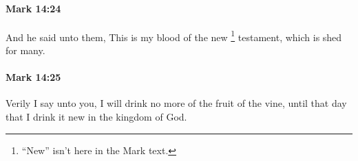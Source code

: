 		\paragraph{Mark 14:24} %
			\label{MARK-14-24}

			And he said unto them, This is my blood of the new%
				\footnote{%
					``New'' isn't here in the Mark text.
					}
			testament, which is shed for many.

			\begin{framed}
			\scriptsize
				\begin{compactdesc}
					\item[SBLG]  \hyperref[DIATHEKE]{} 
				\end{compactdesc}
			\end{framed}

		\paragraph{Mark 14:25} %
			\label{MARK-14-25}

			Verily I say unto you, I will drink no more of the fruit of the vine, until that day that I drink it new in the kingdom of God.

